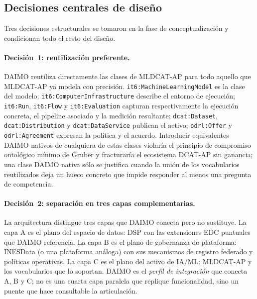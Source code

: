 \documentclass[11pt,a4paper]{article}
\newcommand{\code}[1]{\texttt{#1}}
\begin{document}
\subsection{Decisiones centrales de diseño}\label{sec:method-design}

Tres decisiones estructurales se tomaron en la fase de conceptualización y condicionan todo el resto del diseño.

\paragraph{Decisión~1: reutilización preferente.} DAIMO reutiliza directamente las clases de MLDCAT-AP para todo aquello que MLDCAT-AP ya modela con precisión. \code{it6:MachineLearningModel} es la clase del modelo; \code{it6:ComputerInfrastructure} describe el entorno de ejecución; \code{it6:Run}, \code{it6:Flow} y \code{it6:Evaluation} capturan respectivamente la ejecución concreta, el pipeline asociado y la medición resultante; \code{dcat:Dataset}, \code{dcat:Distribution} y \code{dcat:DataService} publican el activo; \code{odrl:Offer} y \code{odrl:Agreement} expresan la política y el acuerdo. Introducir equivalentes DAIMO-nativos de cualquiera de estas clases violaría el principio de compromiso ontológico mínimo de Gruber y fracturaría el ecosistema DCAT-AP sin ganancia; una clase DAIMO nativa sólo se justifica cuando la unión de los vocabularios reutilizados deja un hueco concreto que impide responder al menos una pregunta de competencia.

\paragraph{Decisión~2: separación en tres capas complementarias.} La arquitectura distingue tres capas que DAIMO conecta pero no sustituye. La capa A es el plano del espacio de datos: DSP con las extensiones EDC puntuales que DAIMO referencia. La capa B es el plano de gobernanza de plataforma: INESData (o una plataforma análoga) con sus mecanismos de registro federado y políticas operativas. La capa C es el plano del activo de IA/ML: MLDCAT-AP y los vocabularios que lo soportan. DAIMO es el \emph{perfil de integración} que conecta A, B y C; no es una cuarta capa paralela que replique funcionalidad, sino un puente que hace consultable la articulación.
\end{document}
